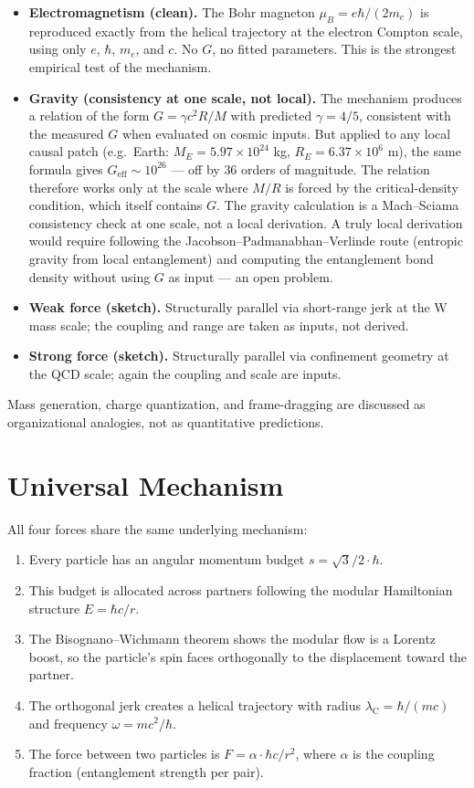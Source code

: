 \documentclass[11pt,letterpaper]{article}
\newcommand{\lambdac}{\lambda_{\mathrm{C}}}
\begin{document}
\begin{itemize}
  \item \textbf{Electromagnetism (clean).} The Bohr magneton
    $\mu_B = e\hbar/(2m_e)$ is reproduced exactly from the helical
    trajectory at the electron Compton scale, using only $e$,
    $\hbar$, $m_e$, and $c$. No $G$, no fitted parameters. This is
    the strongest empirical test of the mechanism.
  \item \textbf{Gravity (consistency at one scale, not local).}
    The mechanism produces a relation of the form $G = \gamma c^2 R/M$
    with predicted $\gamma = 4/5$, consistent with the measured $G$
    when evaluated on cosmic inputs. But applied to any local causal
    patch (e.g.~Earth: $M_E = 5.97 \times 10^{24}$ kg,
    $R_E = 6.37 \times 10^{6}$ m), the same formula gives $G_{\mathrm{eff}}
    \sim 10^{26}$ --- off by 36 orders of magnitude. The relation
    therefore works only at the scale where $M/R$ is forced by the
    critical-density condition, which itself contains $G$. The
    gravity calculation is a Mach--Sciama consistency check at one
    scale, not a local derivation. A truly local derivation would
    require following the Jacobson--Padmanabhan--Verlinde route
    (entropic gravity from local entanglement) and computing the
    entanglement bond density without using $G$ as input --- an
    open problem.
  \item \textbf{Weak force (sketch).} Structurally parallel
    via short-range jerk at the W mass scale; the coupling and
    range are taken as inputs, not derived.
  \item \textbf{Strong force (sketch).} Structurally parallel via
    confinement geometry at the QCD scale; again the coupling and
    scale are inputs.
\end{itemize}
Mass generation, charge quantization, and frame-dragging are
discussed as organizational analogies, not as quantitative
predictions.

\section{Universal Mechanism}

All four forces share the same underlying mechanism:

\begin{enumerate}
  \item Every particle has an angular momentum budget $s = \sqrt{3}/2 \cdot \hbar$.
  \item This budget is allocated across partners following the modular Hamiltonian structure $E = \hbar c/r$.
  \item The Bisognano--Wichmann theorem shows the modular flow is a Lorentz boost, so the particle's spin faces orthogonally to the displacement toward the partner.
  \item The orthogonal jerk creates a helical trajectory with radius $\lambdac = \hbar/(mc)$ and frequency $\omega = mc^2/\hbar$.
  \item The force between two particles is $F = \alpha \cdot \hbar c / r^2$, where $\alpha$ is the coupling fraction (entanglement strength per pair).
\end{enumerate}
\end{document}
